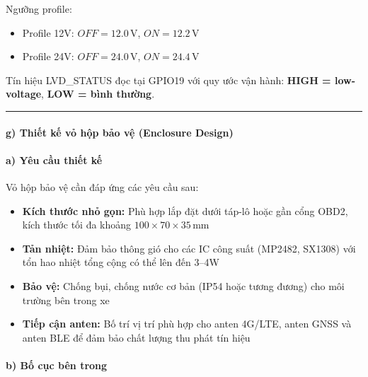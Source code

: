 \documentclass[a4paper]{extarticle}
\providecommand{\tightlist}{%
  \setlength{\itemsep}{0pt}\setlength{\parskip}{0pt}}
\begin{document}
Ngưỡng profile:

\begin{itemize}
\tightlist
\item
  Profile 12V: \(OFF = 12.0\,\mathrm{V}\), \(ON = 12.2\,\mathrm{V}\)
\item
  Profile 24V: \(OFF = 24.0\,\mathrm{V}\), \(ON = 24.4\,\mathrm{V}\)
\end{itemize}

Tín hiệu LVD\_STATUS đọc tại GPIO19 với quy ước vận hành: \textbf{HIGH =
low-voltage}, \textbf{LOW = bình thường}.

\begin{center}\rule{0.5\linewidth}{0.5pt}\end{center}

\paragraph{g) Thiết kế vỏ hộp bảo vệ (Enclosure
Design)}\label{g-thiux1ebft-kux1ebf-vux1ecf-hux1ed9p-bux1ea3o-vux1ec7-enclosure-design}

\paragraph{a) Yêu cầu thiết
kế}\label{a-yuxeau-cux1ea7u-thiux1ebft-kux1ebf}

Vỏ hộp bảo vệ cần đáp ứng các yêu cầu sau:

\begin{itemize}
\tightlist
\item
  \textbf{Kích thước nhỏ gọn:} Phù hợp lắp đặt dưới táp-lô hoặc gần cổng
  OBD2, kích thước tối đa khoảng
  \(100 \times 70 \times 35\,\mathrm{mm}\)
\item
  \textbf{Tản nhiệt:} Đảm bảo thông gió cho các IC công suất (MP2482,
  SX1308) với tổn hao nhiệt tổng cộng có thể lên đến 3--4W
\item
  \textbf{Bảo vệ:} Chống bụi, chống nước cơ bản (IP54 hoặc tương đương)
  cho môi trường bên trong xe
\item
  \textbf{Tiếp cận anten:} Bố trí vị trí phù hợp cho anten 4G/LTE, anten
  GNSS và anten BLE để đảm bảo chất lượng thu phát tín hiệu
\end{itemize}

\paragraph{b) Bố cục bên trong}\label{b-bux1ed1-cux1ee5c-buxean-trong}
\end{document}
